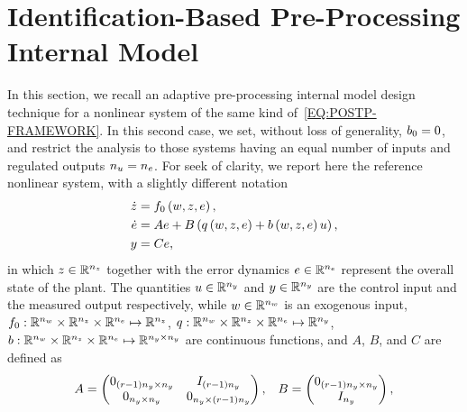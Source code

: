 \section{Identification-Based Pre-Processing Internal Model}%
\label{SEC:PREP-ADAPTIVE-INTERNAL-MODEL}
In this section, we recall an adaptive pre-processing internal model design technique for a nonlinear system of the same
kind of~\eqref{EQ:POSTP-FRAMEWORK}. In this second case, we set, without loss of generality, $b_0 = 0$, and restrict the
analysis to those systems having an equal number of inputs and regulated outputs $n_{u} = n_{e}$. For seek of clarity,
we report here the reference nonlinear system, with a slightly different notation
\begin{equation}%
   \label{EQ:PREP-FRAMEWORK}
   \begin{split}
      \dot{\zz} &= \zfun \lp \ww, \zz, \ee \rp, \\
      \dot{\ee} &= A\ee + B \lp \qfun \lp \ww, \zz, \ee \rp + \bfun \lp w, \zz, \ee \rp u \rp, \\
      \yy &= C\ee,
   \end{split}
\end{equation}
in which $z \in \mathbb{R}^{n_{z}}$ together with the error dynamics $e \in \mathbb{R}^{n_{e}}$ represent the overall state of the plant.
The quantities $u \in \mathbb{R}^{n_{y}}$ and $y \in \mathbb{R}^{n_{y}}$ are the control input and the measured output respectively, while $w \in \mathbb{R}^{n_{w}}$ is
an exogenous input, $f_0 : \mathbb{R}^{n_{w}} \times \mathbb{R}^{n_{z}} \times \mathbb{R}^{n_{e}} \mapsto \mathbb{R}^{n_{z}}$,
$q : \mathbb{R}^{n_{w}} \times \mathbb{R}^{n_{z}} \times \mathbb{R}^{n_{e}} \mapsto \mathbb{R}^{n_{y}}$, $b : \mathbb{R}^{n_{w}} \times \mathbb{R}^{n_{z}} \times \mathbb{R}^{n_{e}} \mapsto \mathbb{R}^{n_{y} \times n_{y}}$
are continuous functions, and $A$, $B$, and $C$ are defined as
\begin{equation*}
   \begin{matrix}
      A =
      \begin{pmatrix}
         0_{(r-1)n_{y} \times n_{y}} & I_{(r-1)n_{y}} \\
         0_{n_{y} \times n_{y}} & 0_{n_{y} \times (r-1)n_{y}}
      \end{pmatrix}, &
      B =
      \begin{pmatrix}
         0_{(r-1)n_{y} \times n_{y}} \\
         I_{n_{y}}
      \end{pmatrix},
   \end{matrix}
\end{equation*}
